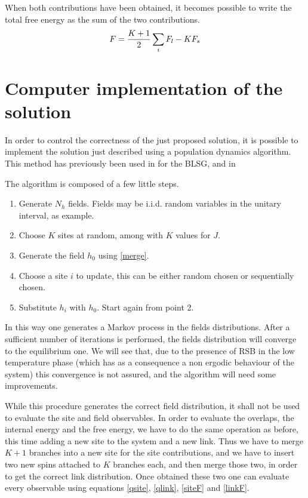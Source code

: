 When both contributions have been obtained, it becomes possible to write the total free energy as the sum of the two contributions.
\begin{equation}
F = {K+1 \over 2}\sum_i F_l -KF_s
\label{RSF}
\end{equation}



\section{Computer implementation of the solution}

In order to control the correctness of the just proposed solution, it is possible to implement the solution just described using a population dynamics algorithm. This method has previously
been used in \cite{bethe} for the BLSG, and in \cite{self}

The algorithm is composed of a few little steps.

\begin{enumerate}
    \item{Generate $N_h$ fields. Fields may be i.i.d. random variables in the unitary interval, as example.}
    \item{Choose $K$ sites at random, among with $K$ values for $J$.}
    \item{Generate the field $h_0$ using \ref{merge}.}
    \item{Choose a site $i$ to update, this can be either random chosen or sequentially chosen.}
    \item{Substitute $h_i$ with $h_0$. Start again from point 2.}
\end{enumerate}

In this way one generates a Markov process in the fields distributions.
After a sufficient number of iterations is performed, the fields distribution will converge to the equilibrium one. We will see that, due to the presence of RSB in the low temperature phase (which has as a consequence a non ergodic behaviour of the system) this convergence is not assured, and the algorithm will need some improvements.

While this procedure generates the correct field distribution, it shall not be used to evaluate the site and field observables. In order to evaluate the overlaps, the internal energy and the free energy, we have to do the same operation as before, this time adding a new site to the system and a new link. Thus we have to merge $K+1$ branches into a new site for the site contributions, and we have to insert two new spins attached to $K$ branches each, and then merge those two, in order to get the correct link distribution. Once obtained these two one can evaluate every observable using equations \ref{qsite}, \ref{qlink}, \ref{siteF} and \ref{linkF}.

